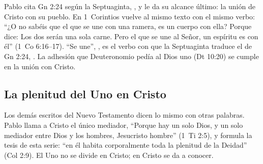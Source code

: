 Pablo cita Gn 2:24 según la Septuaginta, , y le da su alcance último: la unión de Cristo con su pueblo. En 1~Corintios vuelve al mismo texto con el mismo verbo: ``¿O no sabéis que el que se une con una ramera, es un cuerpo con ella? Porque dice: Los dos serán una sola carne. Pero el que se une al Señor, un espíritu es con él'' (1~Co 6:16--17). ``Se une'', , es el verbo con que la Septuaginta traduce el  de Gn 2:24, . La adhesión que Deuteronomio pedía al Dios uno (Dt 10:20) se cumple en la unión con Cristo.


\subsection{La plenitud del Uno en Cristo}
Los demás escritos del Nuevo Testamento dicen lo mismo con otras palabras. Pablo llama a Cristo el único mediador, ``Porque hay un solo Dios, y un solo mediador entre Dios y los hombres, Jesucristo hombre'' (1~Ti 2:5), y formula la tesis de esta serie: ``en él habita corporalmente toda la plenitud de la Deidad'' (Col 2:9). El Uno no se divide en Cristo; en Cristo se da a conocer.

